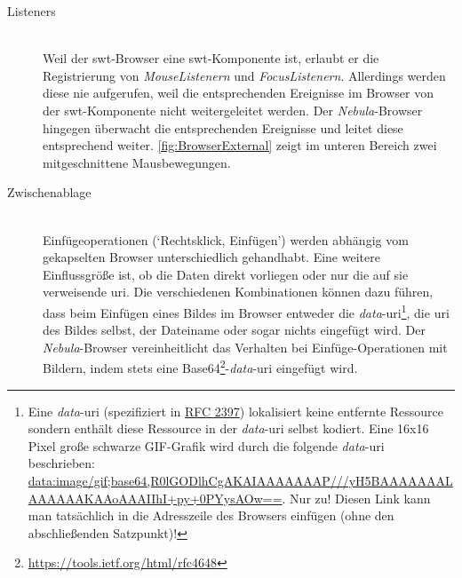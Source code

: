 \begin{description}
  \item[Listeners] \hfill \\
  Weil der \gls{swt}-Browser eine \gls{swt}-Komponente ist, erlaubt er die Registrierung von \textit{MouseListenern} und \textit{FocusListenern}. Allerdings werden diese nie aufgerufen, weil die entsprechenden Ereignisse im Browser von der \gls{swt}-Komponente nicht weitergeleitet werden. Der \textit{Nebula}-Browser hingegen überwacht die entsprechenden Ereignisse und leitet diese entsprechend weiter. \autoref{fig:BrowserExternal} zeigt im unteren Bereich zwei mitgeschnittene Mausbewegungen.

  
  \item[Zwischenablage] \hfill \\
  Einfügeoperationen (`Rechtsklick, Einfügen') werden abhängig vom gekapselten Browser unterschiedlich gehandhabt. Eine weitere Einflussgröße ist, ob die Daten direkt vorliegen oder nur die auf sie verweisende \acrshort{uri}. Die verschiedenen Kombinationen können dazu führen, dass beim Einfügen eines Bildes im Browser entweder die \textit{data}-\acrshort{uri}\footnote{Eine \textit{data}-\acrshort{uri} (spezifiziert in \href{http://tools.ietf.org/html/rfc2397}{RFC 2397}) lokalisiert keine entfernte Ressource sondern enthält diese Ressource in der \textit{data}-\acrshort{uri} selbst kodiert. Eine 16x16 Pixel große schwarze GIF-Grafik wird durch die folgende \textit{data}-\acrshort{uri} beschrieben: \url{data:image/gif;base64,R0lGODlhCgAKAIAAAAAAAP///yH5BAAAAAAALAAAAAAKAAoAAAIIhI+py+0PYysAOw==}. Nur zu! Diesen Link kann man tatsächlich in die Adresszeile des Browsers einfügen (ohne den abschließenden Satzpunkt)!}, die \acrshort{uri} des Bildes selbst, der Dateiname oder sogar nichts eingefügt wird. Der \textit{Nebula}-Browser vereinheitlicht das Verhalten bei Einfüge-Operationen mit Bildern, indem stets eine Base64\footnote{\url{https://tools.ietf.org/html/rfc4648}}-\textit{data}-\acrshort{uri} eingefügt wird.
  

\end{description}
